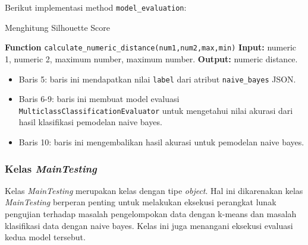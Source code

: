 \newpage
\noindent Berikut implementasi method \texttt{model\_evaluation}:

\begin{minipage}{.8\linewidth}
\begin{algorithm}[H]
  \caption{Menghitung Silhouette Score}\label{alg:6}
  \begin{algorithmic}[1]
  \State \textbf{Function} \texttt{calculate\_numeric\_distance(num1,num2,max,min)}
  \State \textbf{Input:} numeric 1, numeric 2, maximum number, maximum number.
  \State \textbf{Output:} numeric distance.
  \\
  \end{algorithmic}
\end{algorithm}
\end{minipage}

\vspace{0.2cm}
\begin{itemize}
\item Baris 5: baris ini mendapatkan nilai \texttt{label} dari atribut \texttt{naive\_bayes} JSON.
\item Baris 6-9: baris ini membuat model evaluasi \texttt{MulticlassClassificationEvaluator} untuk mengetahui nilai akurasi dari hasil klasifikasi pemodelan naive bayes.
\item Baris 10: baris ini mengembalikan hasil akurasi untuk pemodelan naive bayes.
\end{itemize}

\subsubsection{Kelas \textit{MainTesting}}
Kelas \textit{MainTesting} merupakan kelas dengan tipe \textit{object}. Hal ini dikarenakan kelas \textit{MainTesting} berperan penting untuk melakukan eksekusi perangkat lunak pengujian terhadap masalah pengelompokan data dengan k-means dan masalah klasifikasi data dengan naive bayes. Kelas ini juga menangani eksekusi evaluasi kedua model tersebut.\\

